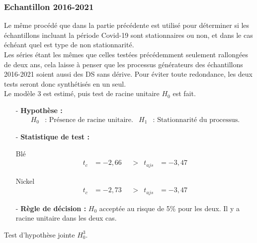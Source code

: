 \subsubsection{Echantillon 2016-2021}
Le même procédé que dans la partie précédente est utilisé pour déterminer si les échantillons incluant la période Covid-19 sont stationnaires ou non, et dans le cas 
échéant quel est type de non stationnarité.\\[11pt]
Les séries étant les mêmes que celles testées précédemment seulement rallongées de deux ans, cela laisse à penser que les processus générateurs des échantillons 
2016-2021 soient aussi des DS sans dérive. Pour éviter toute redondance, les deux tests seront donc synthétisés en un seul.\\[11pt]
Le modèle 3 est estimé, puis test de racine unitaire $H_{0}$ est fait.%
\begin{itemize}
    \item[-]\textbf{Hypothèse :} 
    \begin{align*}
        H_{0} &: \text{ Présence de racine unitaire.} & H_{1} &: \text{ Stationnarité du processus.}
    \end{align*}
    \item[-]\textbf{Statistique de test :} 
    \begin{multicols}{2}
    \centering Blé
    \begin{align*}
            t_{c} &= -2,66 & &> & t_{ajs} &= -3,47
    \end{align*}

    \columnbreak

    \centering Nickel
    \begin{align*}
        t_{c} &= -2,73 & &> & t_{ajs} &= -3,47
    \end{align*}
    \end{multicols}
    \item[-]\textbf{Règle de décision :} $H_{0}$ acceptée au risque de 5\% pour les deux. Il y a racine unitaire dans les deux cas.
    \end{itemize}
    Test d'hypothèse jointe $H_{0}^{3}$.
